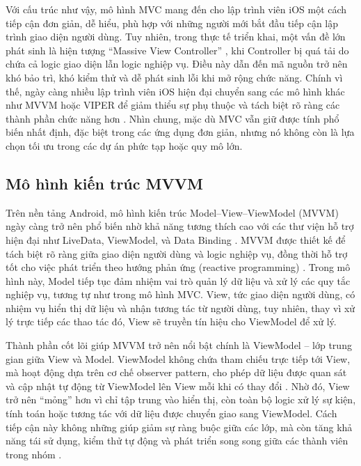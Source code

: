     \begin{flushleft}
      \hspace*{0.8cm}Với cấu trúc như vậy, mô hình MVC mang đến cho lập trình viên iOS một cách tiếp cận đơn giản, dễ hiểu, phù hợp với những người mới bắt đầu tiếp cận lập trình giao diện người dùng. Tuy nhiên, trong thực tế triển khai, một vấn đề lớn phát sinh là hiện tượng “Massive View Controller” \cite{massive_vc}, khi Controller bị quá tải do chứa cả logic giao diện lẫn logic nghiệp vụ. Điều này dẫn đến mã nguồn trở nên khó bảo trì, khó kiểm thử và dễ phát sinh lỗi khi mở rộng chức năng. Chính vì thế, ngày càng nhiều lập trình viên iOS hiện đại chuyển sang các mô hình khác như MVVM hoặc VIPER để giảm thiểu sự phụ thuộc và tách biệt rõ ràng các thành phần chức năng hơn \cite{mvvm_viper}. Nhìn chung, mặc dù MVC vẫn giữ được tính phổ biến nhất định, đặc biệt trong các ứng dụng đơn giản, nhưng nó không còn là lựa chọn tối ưu trong các dự án phức tạp hoặc quy mô lớn.
    \end{flushleft}

\subsection{Mô hình kiến trúc MVVM}
\renewcommand{\labelitemi}{--}    
    \begin{flushleft}
        \hspace*{0.8cm}Trên nền tảng Android, mô hình kiến trúc Model–View–ViewModel (MVVM) ngày càng trở nên phổ biến nhờ khả năng tương thích cao với các thư viện hỗ trợ hiện đại như LiveData, ViewModel, và Data Binding \cite{android_mvvm_google}. MVVM được thiết kế để tách biệt rõ ràng giữa giao diện người dùng và logic nghiệp vụ, đồng thời hỗ trợ tốt cho việc phát triển theo hướng phản ứng (reactive programming) \cite{reactive_mvvm}. Trong mô hình này, Model tiếp tục đảm nhiệm vai trò quản lý dữ liệu và xử lý các quy tắc nghiệp vụ, tương tự như trong mô hình MVC. View, tức giao diện người dùng, có nhiệm vụ hiển thị dữ liệu và nhận tương tác từ người dùng, tuy nhiên, thay vì xử lý trực tiếp các thao tác đó, View sẽ truyền tín hiệu cho ViewModel để xử lý.
    \end{flushleft}

    \begin{flushleft}
      \hspace*{0.8cm}Thành phần cốt lõi giúp MVVM trở nên nổi bật chính là ViewModel – lớp trung gian giữa View và Model. ViewModel không chứa tham chiếu trực tiếp tới View, mà hoạt động dựa trên cơ chế observer pattern, cho phép dữ liệu được quan sát và cập nhật tự động từ ViewModel lên View mỗi khi có thay đổi \cite{observer_pattern}. Nhờ đó, View trở nên “mỏng” hơn vì chỉ tập trung vào hiển thị, còn toàn bộ logic xử lý sự kiện, tính toán hoặc tương tác với dữ liệu được chuyển giao sang ViewModel. Cách tiếp cận này không những giúp giảm sự ràng buộc giữa các lớp, mà còn tăng khả năng tái sử dụng, kiểm thử tự động và phát triển song song giữa các thành viên trong nhóm \cite{testability_mvvm}.
    \end{flushleft}

